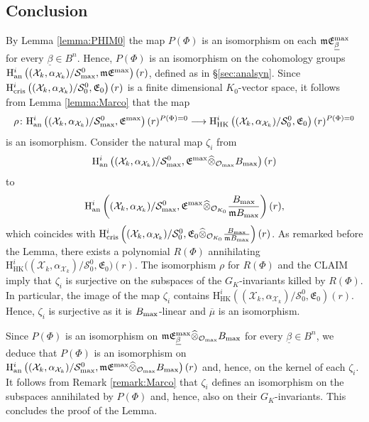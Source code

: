 \documentclass[asterisque,english]{smfart}
\begin{document}
\subsection{Conclusion}
By Lemma \ref{lemma:PHIM0}  the map $P(\Phi)$ is an isomorphism on each $\mathfrak{m} \mathfrak{E}^{\rm max}_{\underline{\beta}} $ for every $\underline{\beta}\in B^n$. Hence, $P(\Phi)$ is an isomorphism on the cohomology groups  $\mathrm{H}^i_{\rm an}\left((\mathcal{X}_k,\alpha_{\mathcal{X}_k})/\mathcal{S}_{\rm max}^0,\mathfrak{m} \mathfrak{E}^{\rm max}\right)(r)$, defined as in  \S \ref{sec:analsyn}. Since $\mathrm{H}^i_{\rm cris}\left((\mathcal{X}_k,\alpha_{\mathcal{X}_k})/ \mathcal{S}_0^0,\mathfrak{E}_0 \right)(r)$ is a finite dimensional $K_0$-vector space, it follows from Lemma \ref{lemma:Marco} that the map
$$\rho\colon \mathrm{H}^i_{\rm an}\left((\mathcal{X}_k,\alpha_{\mathcal{X}_k})/\mathcal{S}_{\rm max}^0,\mathfrak{E}^{\rm max}\right)(r)^{P(\Phi)=0}\longrightarrow \mathrm{H}^i_{\mathrm{HK}}\left((\mathcal{X}_k,\alpha_{\mathcal{X}_k})/ \mathcal{S}_0^0,\mathfrak{E}_0 \right)(r)^{P(\Phi)=0} $$is an isomorphism.
 Consider the natural map $\zeta_i$ from
$$\mathrm{H}^i_{\rm an}\left((\mathcal{X}_k,\alpha_{\mathcal{X}_k})/\mathcal{S}_{\rm max}^0,\mathfrak{E}^{\rm max} \widehat{\otimes}_{\mathcal{O}_{\rm max}}B_{\rm max}\right)(r)$$ to $$\mathrm{H}^i_{\rm an}\left((\mathcal{X}_k,\alpha_{\mathcal{X}_k})/\mathcal{S}_{\rm max}^0,\mathfrak{E}^{\rm max} \widehat{\otimes}_{\mathcal{O}_{K_0}}\frac{B_{\rm max}}{\mathfrak{m} B_{\rm max}}\right)(r) ,$$which coincides with  $\mathrm{H}^i_{\rm cris}\left((\mathcal{X}_k,\alpha_{\mathcal{X}_k})/\mathcal{S}_0^0,\mathfrak{E}_0 \widehat{\otimes}_{\mathcal{O}_{K_0}}\frac{B_{\rm max}}{\mathfrak{m} B_{\rm max}}\right)(r)$.  As remarked before the Lemma, there exists a polynomial $R(\Phi)$ annihilating $\mathrm{H}^i_{\mathrm{HK}}\bigl((\mathcal{X}_k,\alpha_{\mathcal{X}_k})/ \mathcal{S}_0^0, \mathfrak{E}_0\bigr)(r)$. The isomorphism $\rho$ for $R(\Phi)$ and the CLAIM imply that $\zeta_i$ is surjective on the subspaces of the $G_K$-invariants killed by $R(\Phi)$.  In particular, the image of the map $\zeta_i$ contains $ \mathrm{H}^i_{\mathrm{HK}}\left((\mathcal{X}_k,\alpha_{\mathcal{X}_k})/ \mathcal{S}_0^0,\mathfrak{E}_0 \right)(r)$. Hence, $\zeta_i$  is surjective as it is $B_{\rm max}$-linear and $\overline{\mu}$ is an isomorphism.  


Since $P(\Phi)$ is an isomorphism on $\mathfrak{m} \mathfrak{E}^{\rm max}_{\underline{\beta}}\widehat{\otimes}_{\mathcal{O}_{\rm max}}B_{\rm max} $ for every $\underline{\beta}\in B^n$, we deduce that $P(\Phi)$ is an isomorphism on $\mathrm{H}^i_{\rm an}\left((\mathcal{X}_k,\alpha_{\mathcal{X}_k})/\mathcal{S}_{\rm max}^0,\mathfrak{m} \mathfrak{E}^{\rm max} \widehat{\otimes}_{\mathcal{O}_{\rm max}}B_{\rm max}\right)(r)$ and, hence, on the kernel of each $\zeta_i$. It follows from Remark \ref{remark:Marco} that  $\zeta_i$ defines an isomorphism on the subspaces annihilated by $P(\Phi)$ and, hence, also on their $G_K$-invariants. This concludes the proof of the Lemma.
\end{document}
